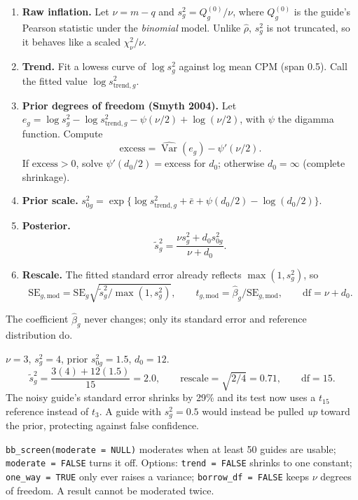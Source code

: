 \documentclass[11pt]{article}
\newcommand{\Var}{\operatorname{Var}}
\begin{document}
\begin{enumerate}[itemsep=2pt]
\item \textbf{Raw inflation.} Let $\nu=m-q$ and
$s_g^2=Q^{(0)}_g/\nu$, where $Q^{(0)}_g$ is the guide's Pearson statistic
under the \emph{binomial} model.  Unlike $\hat\rho$, $s_g^2$ is not
truncated, so it behaves like a scaled $\chi^2_\nu/\nu$.
\item \textbf{Trend.} Fit a lowess curve of $\log s_g^2$ against log mean
CPM (span 0.5).  Call the fitted value $\log s^2_{\text{trend},g}$.
\item \textbf{Prior degrees of freedom (Smyth 2004).} Let
$e_g=\log s_g^2-\log s^2_{\text{trend},g}-\psi(\nu/2)+\log(\nu/2)$, with
$\psi$ the digamma function.  Compute
\[
\text{excess}=\widehat{\Var}(e_g)-\psi'(\nu/2).
\]
If $\text{excess}>0$, solve $\psi'(d_0/2)=\text{excess}$ for $d_0$;
otherwise $d_0=\infty$ (complete shrinkage).
\item \textbf{Prior scale.} $s_{0g}^2=\exp\{\log s^2_{\text{trend},g}
+\bar e+\psi(d_0/2)-\log(d_0/2)\}$.
\item \textbf{Posterior.}
\begin{equation}
\tilde s_g^2=\frac{\nu s_g^2+d_0 s_{0g}^2}{\nu+d_0}.
\end{equation}
\item \textbf{Rescale.} The fitted standard error already reflects
$\max(1,s_g^2)$, so
\[
\mathrm{SE}_{g,\text{mod}}=\mathrm{SE}_g\sqrt{\tilde s_g^2/\max(1,s_g^2)},\qquad
t_{g,\text{mod}}=\hat\beta_g/\mathrm{SE}_{g,\text{mod}},\qquad
\text{df}=\nu+d_0.
\]
\end{enumerate}
The coefficient $\hat\beta_g$ never changes; only its standard error and
reference distribution do.

\begin{example}
$\nu=3$, $s_g^2=4$, prior $s_{0g}^2=1.5$, $d_0=12$.
\[
\tilde s_g^2=\frac{3(4)+12(1.5)}{15}=2.0,\qquad
\text{rescale}=\sqrt{2/4}=0.71,\qquad \text{df}=15.
\]
The noisy guide's standard error shrinks by 29\% and its test now uses a
$t_{15}$ reference instead of $t_3$.  A guide with $s_g^2=0.5$ would instead
be pulled \emph{up} toward the prior, protecting against false confidence.
\end{example}

\begin{incode}
\texttt{bb\_screen(moderate = NULL)} moderates when at least 50 guides are
usable; \texttt{moderate = FALSE} turns it off.  Options:
\texttt{trend = FALSE} shrinks to one constant; \texttt{one\_way = TRUE} only
ever raises a variance; \texttt{borrow\_df = FALSE} keeps $\nu$ degrees of
freedom.  A result cannot be moderated twice.
\end{incode}
\end{document}
